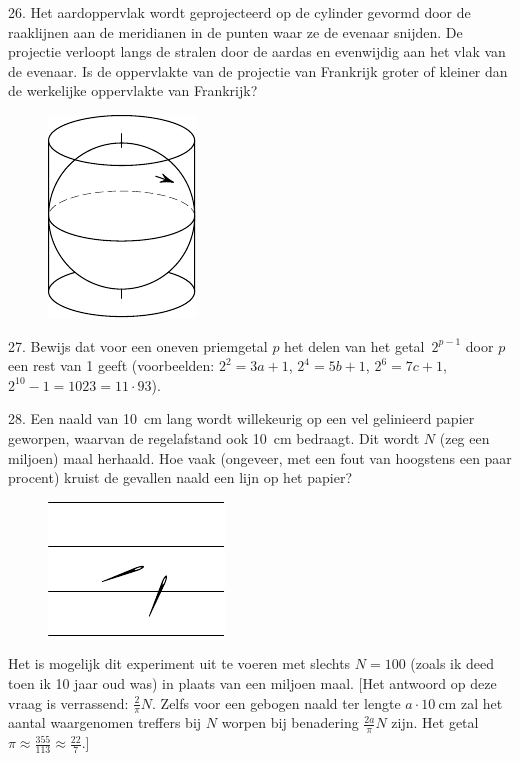\begin{problem}{26.}
	Het aardoppervlak wordt geprojecteerd op de cylinder gevormd door de raaklijnen aan de meridianen in de punten waar ze de evenaar snijden. De projectie verloopt langs de stralen door de aardas en evenwijdig aan het vlak van de evenaar. Is de oppervlakte van de projectie van Frankrijk groter of kleiner dan de werkelijke oppervlakte van Frankrijk?
	\begin{figure}
		\includegraphics{resources/taskbook-10}
	\end{figure}
\end{problem}

\begin{problem}{27.}
	Bewijs dat voor een oneven priemgetal $p$ het delen van het getal~$2^{p-1}$ door $p$ een rest van 1 geeft (voorbeelden: $2^2 = 3a+1$, $2^4 = 5b+1$, $2^6 = 7c+1$, $2^{10} - 1 = 1023 = 11\cdot 93$).
\end{problem}

\clearpage

\begin{problem}{28.}
	Een naald van \SI{10}{\cm} lang wordt willekeurig op een vel gelinieerd papier geworpen, waarvan de regelafstand ook \SI{10}{\cm} bedraagt. Dit wordt $N$ (zeg een miljoen) maal herhaald. Hoe vaak (ongeveer, met een fout van hoogstens een paar procent) kruist de gevallen naald een lijn op het papier?
	\begin{figure}
		\includegraphics{resources/taskbook-12}
	\end{figure}
	Het is mogelijk dit experiment uit te voeren met slechts $N=100$ (zoals ik deed toen ik 10 jaar oud was) in plaats van een miljoen maal. [Het antwoord op deze vraag is verrassend: $\frac{2}{\pi} N$. Zelfs voor een gebogen naald ter lengte $a \cdot \SI{10}{\cm}$ zal het aantal waargenomen treffers bij $N$ worpen bij benadering $\frac{2 a}{\pi} N$ zijn. Het getal $\pi \approx \frac{355}{113} \approx \frac{22}{7}$.]
\end{problem}

